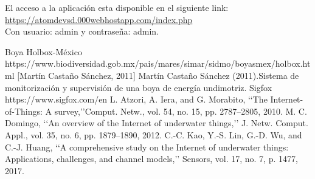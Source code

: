\documentclass[12pt]{book}
\begin{document}
El acceso a la aplicación esta disponible en el siguiente link: \\
\underline{https://atomdevsd.000webhostapp.com/index.php} \\
Con usuario: admin y contraseña: admin.








\begin{thebibliography}{n}
	Boya Holbox-México \\
	https://www.biodiversidad.gob.mx/pais/mares/simar/sidmo/boyasmex/holbox.html	
	[Martín Castaño Sánchez, 2011] Martín Castaño Sánchez (2011).Sistema de monitorización y supervisión de una boya de energía undimotriz. 
	Sigfox 	https://www.sigfox.com/en
	L. Atzori, A. Iera, and G. Morabito, ‘‘The Internet-of-Things: A survey,’’Comput. Netw., vol. 54, no. 15, pp. 2787–2805, 2010.
	M. C. Domingo, ‘‘An overview of the Internet of underwater things,’’
	J. Netw. Comput. Appl., vol. 35, no. 6, pp. 1879–1890, 2012.
	C.-C. Kao, Y.-S. Lin, G.-D. Wu, and C.-J. Huang, ‘‘A comprehensive study
	on the Internet of underwater things: Applications, challenges, and channel models,’’ Sensors, vol. 17, no. 7, p. 1477, 2017.
\end{thebibliography}
\end{document}
